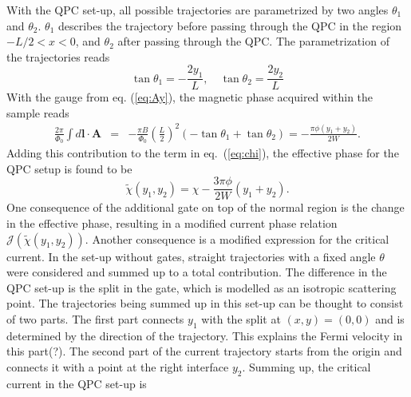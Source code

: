 With the QPC set-up, all possible trajectories are parametrized by two angles $\theta_1$ and $\theta_2$. $\theta_1$ describes the trajectory before passing through the QPC in the region $ -L/2 < x < 0$, and  $\theta_2$ after passing through the QPC. The parametrization of the trajectories reads
\begin{equation}
\tan \theta_1 = - \frac{2 y_1}{L}, \quad \tan \theta_2 = \frac{2 y_2}{L}
\label{eq:QPCparametrization}
\end{equation}
With the gauge from eq. (\ref{eq:Ay}), the magnetic phase acquired within the sample reads
\begin{eqnarray}
\frac{2\pi}{\Phi_0} \int d\mathbf{l} \cdot \mathbf{A}  &=&
-\frac{\pi B}{\Phi_0}\left(\frac{L}{2}\right)^2
\left(-\tan\theta_1 + \tan\theta_2\right) =
-\frac{\pi \phi (y_1+y_2)}{2 W}.
\label{eq:phaseQPC}
\end{eqnarray}
Adding this contribution to the term in eq.~(\ref{eq:chi}), the effective phase for the QPC setup is found to be
\begin{equation}
\tilde{\chi}(y_1,y_2)=\chi-\frac{3 \pi \phi }{2W}(y_1+y_2).
\label{eq:chiQPC}
\end{equation}
One consequence of the additional gate on top of the normal region is the change in the effective phase, resulting in a modified current phase relation $\mathcal{J}(\tilde{\chi}(y_1, y_2))$. Another consequence is a modified expression for the critical current. In the set-up without gates, straight trajectories with a fixed angle $\theta$ were considered and summed up to a total contribution. The difference in the QPC set-up is the split in the gate, which is modelled as an isotropic scattering point. The trajectories being summed up in this set-up can be thought to consist of two parts. The first part connects $y_1$ with the split at $(x, y) = (0, 0)$ and is determined by the direction of the trajectory. This explains the Fermi velocity in this part(?). The second part of the current trajectory starts from the origin and connects it with a point at the right interface $y_2$. Summing up, the  critical current in the QPC set-up is
